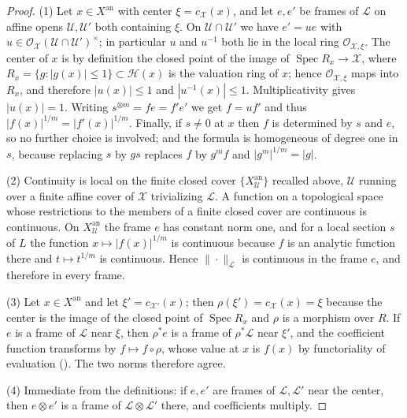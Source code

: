 \begin{proof}
(1) Let $x\in X^{\mathrm{an}}$ with center $\xi=c_{\mathcal X}(x)$, and
let $e,e'$ be frames of $\mathcal L$ on affine opens
$\mathcal U,\mathcal U'$ both containing $\xi$. On
$\mathcal U\cap\mathcal U'$ we have $e'=ue$ with
$u\in\mathcal O_{\mathcal X}(\mathcal U\cap\mathcal U')^\times$; in
particular $u$ and $u^{-1}$ both lie in the local ring
$\mathcal O_{\mathcal X,\xi}$. The center of $x$ is by definition the
closed point of the image of $\operatorname{Spec}R_x\to\mathcal X$, where
$R_x=\{g:|g(x)|\le1\}\subset\mathcal H(x)$ is the valuation ring of $x$;
hence $\mathcal O_{\mathcal X,\xi}$ maps into $R_x$, and therefore
$|u(x)|\le1$ and $|u^{-1}(x)|\le1$. Multiplicativity gives
$|u(x)|=1$. Writing $s^{\otimes m}=fe=f'e'$ we get $f=uf'$ and thus
$|f(x)|^{1/m}=|f'(x)|^{1/m}$. Finally, if $s\ne0$ at $x$ then $f$ is
determined by $s$ and $e$, so no further choice is involved; and the
formula is homogeneous of degree one in $s$, because replacing $s$ by
$gs$ replaces $f$ by $g^mf$ and $|g^m|^{1/m}=|g|$.

(2) Continuity is local on the finite closed cover
$\{X^{\mathrm{an}}_{\mathcal U}\}$ recalled above, $\mathcal U$ running
over a finite affine cover of $\mathcal X$ trivializing $\mathcal L$. A
function on a topological space whose restrictions to the members of a
finite closed cover are continuous is continuous. On
$X^{\mathrm{an}}_{\mathcal U}$ the frame $e$ has constant norm one, and
for a local section $s$ of $L$ the function $x\mapsto|f(x)|^{1/m}$ is
continuous because $f$ is an analytic function there and $t\mapsto
t^{1/m}$ is continuous. Hence $\|\cdot\|_{\mathcal L}$ is continuous in
the frame $e$, and therefore in every frame.

(3) Let $x\in X^{\mathrm{an}}$ and let $\xi'=c_{\mathcal X'}(x)$; then
$\rho(\xi')=c_{\mathcal X}(x)=\xi$ because the center is the image of the
closed point of $\operatorname{Spec}R_x$ and $\rho$ is a morphism over
$R$. If $e$ is a frame of $\mathcal L$ near $\xi$, then
$\rho^*e$ is a frame of $\rho^*\mathcal L$ near $\xi'$, and the
coefficient function transforms by $f\mapsto f\circ\rho$, whose value at
$x$ is $f(x)$ by functoriality of evaluation
(). The two norms therefore agree.

(4) Immediate from the definitions: if $e,e'$ are frames of
$\mathcal L,\mathcal L'$ near the center, then $e\otimes e'$ is a frame
of $\mathcal L\otimes\mathcal L'$ there, and coefficients multiply.
\end{proof}

